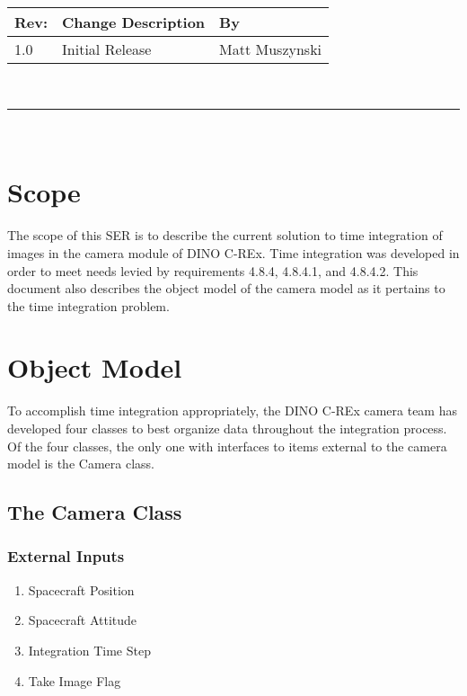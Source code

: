 \documentclass[]{DINOReportMemo}
\begin{document}
\makeCover
%
%
\pagestyle{empty}
{\renewcommand{\arraystretch}{2}
\noindent
\begin{longtable}{|p{0.5in}|p{4.5in}|p{1.14in}|}
\hline
{\bfseries Rev}: & {\bfseries Change Description} & {\bfseries By} \\
\hline
1.0 & Initial Release & Matt Muszynski \\ %
\hline

\end{longtable}
}

\newpage
\setcounter{page}{1}
\pagestyle{fancy}

\tableofcontents
~\\ \hrule ~\\

\newpage
\section{Scope}
The scope of this SER is to describe the current solution to time integration of images in the camera module of DINO C-REx. Time integration was developed in order to meet needs levied by requirements 4.8.4, 4.8.4.1, and 4.8.4.2. This document also describes the object model of the camera model as it pertains to the time integration problem.
\section{Object Model}
To accomplish time integration appropriately, the DINO C-REx camera team has developed four classes to best organize data throughout the integration process. Of the four classes, the only one with interfaces to items external to the camera model is the Camera class. 

\subsection{The Camera Class}

\subsubsection{External Inputs}
\begin{enumerate}
    \item Spacecraft Position
    \item Spacecraft Attitude
    \item Integration Time Step
    \item Take Image Flag
\end{enumerate}
\end{document}
